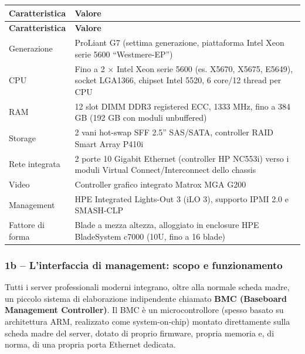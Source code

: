 \documentclass[11pt,a4paper]{article}
\begin{document}
\begin{center}
\begin{longtable}{p{4.2cm}p{9.8cm}}
\toprule
\textbf{Caratteristica} & \textbf{Valore} \\
\midrule
\endfirsthead
\toprule
\textbf{Caratteristica} & \textbf{Valore} \\
\midrule
\endhead
Generazione & ProLiant G7 (settima generazione, piattaforma Intel Xeon serie 5600 ``Westmere-EP'') \\
CPU & Fino a 2 $\times$ Intel Xeon serie 5600 (es. X5670, X5675, E5649), socket LGA1366, chipset Intel 5520, 6 core/12 thread per CPU \\
RAM & 12 slot DIMM DDR3 registered ECC, 1333 MHz, fino a 384 GB (192 GB con moduli unbuffered) \\
Storage & 2 vani hot-swap SFF 2.5'' SAS/SATA, controller RAID Smart Array P410i \\
Rete integrata & 2 porte 10 Gigabit Ethernet (controller HP NC553i) verso i moduli Virtual Connect/Interconnect dello chassis \\
Video & Controller grafico integrato Matrox MGA G200 \\
Management & HPE Integrated Lights-Out 3 (iLO 3), supporto IPMI 2.0 e SMASH-CLP \\
Fattore di forma & Blade a mezza altezza, alloggiato in enclosure HPE BladeSystem c7000 (10U, fino a 16 blade) \\
\bottomrule
\end{longtable}
\end{center}

\subsubsection{1b -- L'interfaccia di management: scopo e funzionamento}

Tutti i server professionali moderni integrano, oltre alla normale scheda madre, un piccolo sistema di elaborazione indipendente chiamato \textbf{BMC (Baseboard Management Controller)}. Il BMC è un microcontrollore (spesso basato su architettura ARM, realizzato come system-on-chip) montato direttamente sulla scheda madre del server, dotato di proprio firmware, propria memoria e, di norma, di una propria porta Ethernet dedicata.
\end{document}

